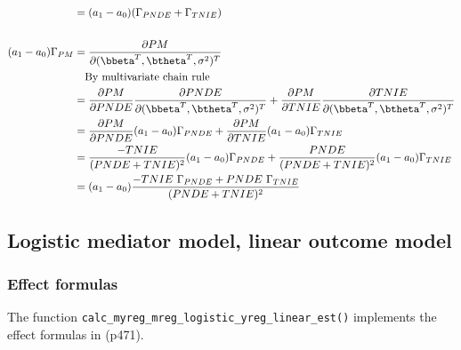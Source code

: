 \documentclass[dvipdfmx,10pt]{article}
\begin{document}
\begin{align*}
  &= (a_{1}-a_{0})(\Gamma_{PNDE} + \Gamma_{TNIE})\\
  \\
  (a_{1}-a_{0})\Gamma_{PM}
  &= \frac{\partial PM}{\partial (\bbeta^{T},\btheta^{T},\sigma^2)^{T}}\\
  &~~~\text{By multivariate chain rule}\\
  &= \frac{\partial PM}{\partial PNDE}\frac{\partial PNDE}{\partial (\bbeta^{T},\btheta^{T},\sigma^2)^{T}} + \frac{\partial PM}{\partial TNIE}\frac{\partial TNIE}{\partial (\bbeta^{T},\btheta^{T},\sigma^2)^{T}}\\
  &= \frac{\partial PM}{\partial PNDE}(a_{1}-a_{0})\Gamma_{PNDE} + \frac{\partial PM}{\partial TNIE}(a_{1}-a_{0})\Gamma_{TNIE}\\
  &= \frac{-TNIE}{(PNDE+TNIE)^{2}}(a_{1}-a_{0})\Gamma_{PNDE} + \frac{PNDE}{(PNDE+TNIE)^{2}}(a_{1}-a_{0})\Gamma_{TNIE}\\
  &= (a_{1}-a_{0}) \frac{-TNIE~\Gamma_{PNDE} + PNDE~\Gamma_{TNIE}}{(PNDE+TNIE)^{2}}\\
\end{align*}


\subsection{Logistic mediator model, linear outcome model}
\label{sec:org9ca5de7}
\subsubsection{Effect formulas}
\label{sec:orga48726b}
The function \texttt{calc\_myreg\_mreg\_logistic\_yreg\_linear\_est()} implements the effect formulas in \cite{vanderweeleExplanationCausalInference2015} (p471).
\end{document}
